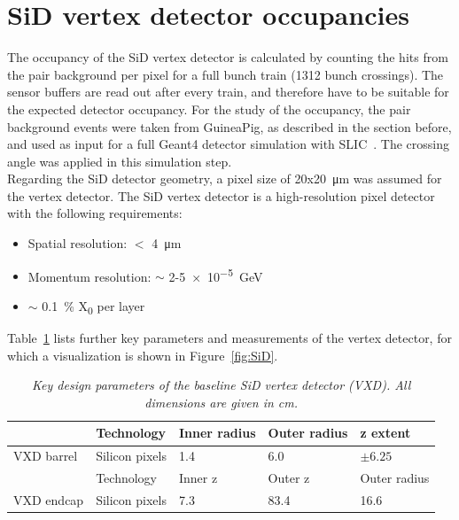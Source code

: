 \section{SiD vertex detector occupancies}
The occupancy of the SiD vertex detector is calculated by counting the hits from the pair background per pixel for a full bunch train (1312 bunch crossings).
The sensor buffers are read out after every train, and therefore have to be suitable for the expected detector occupancy.
For the study of the occupancy, the pair background events were taken from GuineaPig, as described in the section before, and used as input for a full Geant4 detector simulation with SLIC~\cite{SLIC}.
The crossing angle was applied in this simulation step.\\
Regarding the SiD detector geometry, a pixel size of 20x\SI{20}{\micro\meter} was assumed for the vertex detector.
The SiD vertex detector is a high-resolution pixel detector with the following requirements:
\begin{itemize}
 \item Spatial resolution: $<$ \SI{4}{\micro\meter}
 \item Momentum resolution: $\sim$ 2-\SI{5e-5}{\GeV}
 \item $\sim$ \SI{0.1}{\percent} X\textsubscript{0} per layer
\end{itemize}
Table~\ref{tab:KeyParametersSiD} lists further key parameters and measurements of the vertex detector, for which a visualization is shown in Figure~\ref{fig:SiD}.
\begin{table}[h]
\caption{\textit{Key design parameters of the baseline SiD vertex detector (VXD). All dimensions are given in cm.}}
\label{tab:KeyParametersSiD}
\centering
\begin{tabularx}{\textwidth}{l|llll}
\hline\hline
& Technology & Inner radius & Outer radius & z extent\\
\hline
VXD barrel & Silicon pixels & 1.4 & 6.0 & $\pm 6.25$ \\
\hline\hline
& Technology & Inner z & Outer z & Outer radius\\
\hline
VXD endcap & Silicon pixels & 7.3 & 83.4 & 16.6 \\
\hline\hline
\end{tabularx}
\end{table}

